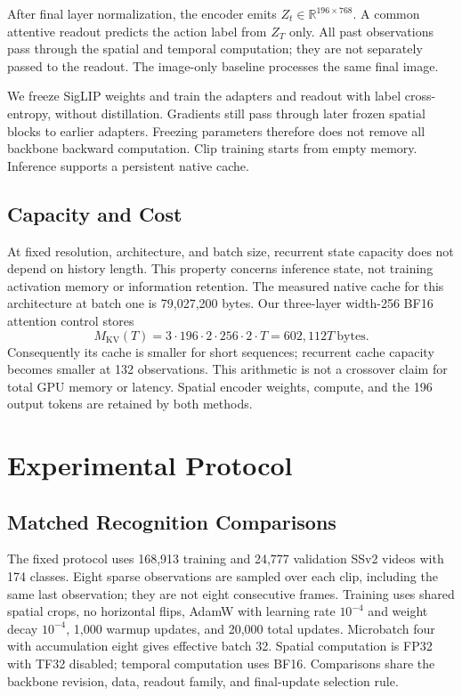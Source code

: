 \documentclass[letterpaper,10pt,conference]{ieeeconf}
\begin{document}
After final layer normalization, the encoder emits
$Z_t\in\mathbb{R}^{196\times768}$. A common attentive readout predicts
the action label from $Z_T$ only. All past observations pass through the
spatial and temporal computation; they are not separately passed to the
readout. The image-only baseline processes the same final image.

We freeze SigLIP weights and train the adapters and readout with label
cross-entropy, without distillation. Gradients still pass through later
frozen spatial blocks to earlier adapters. Freezing parameters therefore
does not remove all backbone backward computation. Clip training starts
from empty memory. Inference supports a persistent native cache.

\subsection{Capacity and Cost}
At fixed resolution, architecture, and batch size, recurrent state capacity
does not depend on history length. This property concerns inference state,
not training activation memory or information retention. The measured
native cache for this architecture at batch one is 79,027,200 bytes.
Our three-layer width-256 BF16 attention control stores
\begin{equation}
 M_{\mathrm{KV}}(T)=3\cdot196\cdot2\cdot256\cdot2\cdot T
                  =602{,}112T\ \mathrm{bytes}.
\end{equation}
Consequently its cache is smaller for short sequences; recurrent cache
capacity becomes smaller at 132 observations. This arithmetic is not a
crossover claim for total GPU memory or latency. Spatial encoder weights,
compute, and the 196 output tokens are retained by both methods.

\section{Experimental Protocol}
\subsection{Matched Recognition Comparisons}
The fixed protocol uses 168,913 training and 24,777 validation SSv2 videos
with 174 classes. Eight sparse observations are sampled over each clip,
including the same last observation; they are not eight consecutive frames.
Training uses shared spatial crops, no horizontal flips, AdamW with
learning rate $10^{-4}$ and weight decay $10^{-4}$, 1,000 warmup updates,
and 20,000 total updates. Microbatch four with accumulation eight gives
effective batch 32. Spatial computation is FP32 with TF32 disabled;
temporal computation uses BF16. Comparisons share the backbone revision,
data, readout family, and final-update selection rule.
\end{document}
